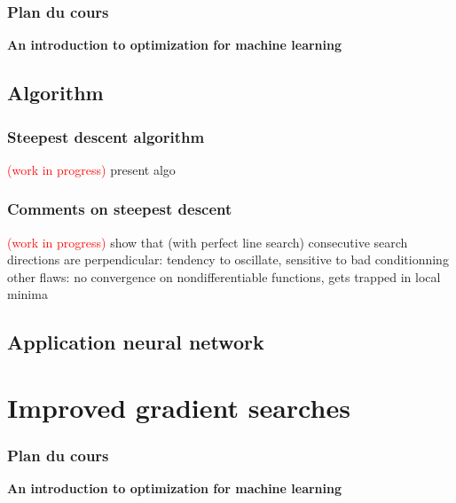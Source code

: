 \documentclass[12pt]{beamer}
\begin{document}
\begin{frame}%
\frametitle{Plan du cours} 
\begin{center} \textbf{An introduction to optimization for machine learning} \end{center}
\tableofcontents[currentsection]
\end{frame}

\subsection{Algorithm}

\begin{frame}
\frametitle{Steepest descent algorithm} 
\textcolor{red}{(work in progress)}
present algo\\
\end{frame}

\begin{frame}
\frametitle{Comments on steepest descent} 
\textcolor{red}{(work in progress)}
show that (with perfect line search) consecutive search directions are perpendicular: tendency to oscillate, sensitive to bad conditionning\\
other flaws: no convergence on nondifferentiable functions, gets trapped in local minima
\end{frame}

\subsection{Application neural network}

\section{Improved gradient searches}
\begin{frame}%
\frametitle{Plan du cours} 
\begin{center} \textbf{An introduction to optimization for machine learning} \end{center}
\tableofcontents[currentsection]
\end{frame}
\end{document}
